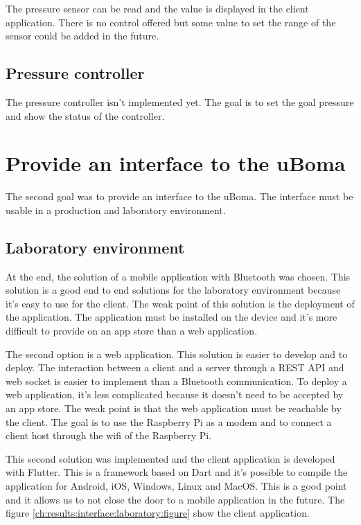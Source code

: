 The pressure sensor can be read and the value is displayed in the client application.
There is no control offered but some value to set the range of the sensor could be added in the future.

\subsection{Pressure controller}
\label{ch:results:control:controller}

The pressure controller isn't implemented yet.
The goal is to set the goal pressure and show the status of the controller.


\section{Provide an interface to the uBoma}
\label{ch:results:interface}

The second goal was to provide an interface to the uBoma.
The interface must be usable in a production and laboratory environment.

\subsection{Laboratory environment}
\label{ch:results:interface:laboratory}

At the end, the solution of a mobile application with Bluetooth was chosen.
This solution is a good end to end solutions for the laboratory environment because it's easy to use for the client.
The weak point of this solution is the deployment of the application.
The application must be installed on the device and it's more difficult to provide on an app store than a web application.

The second option is a web application.
This solution is easier to develop and to deploy.
The interaction between a client and a server through a REST API and web socket is easier to implement than a Bluetooth communication.
To deploy a web application, it's less complicated because it doesn't need to be accepted by an app store.
The weak point is that the web application must be reachable by the client.
The goal is to use the Raspberry Pi as a modem and to connect a client host through the wifi of the Raspberry Pi.

This second solution was implemented and the client application is developed with Flutter.
This is a framework based on Dart and it's possible to compile the application for Android, iOS, Windows, Linux and MacOS.
This is a good point and it allows us to not close the door to a mobile application in the future.
The figure \ref{ch:results:interface:laboratory:figure} show the client application.

